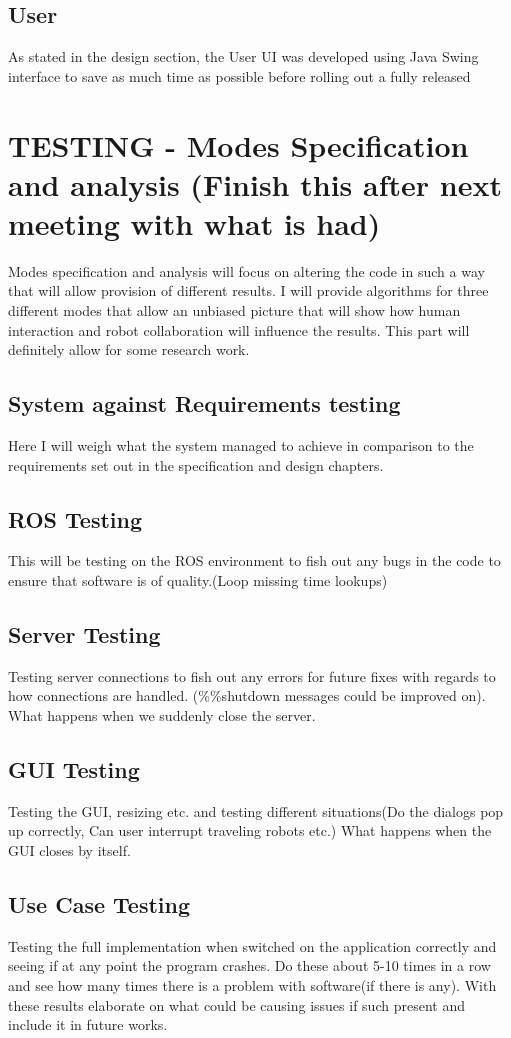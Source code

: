 \documentclass{report}
\begin{document}
    \section{User}
      As stated in the design section, the User UI was developed using Java Swing interface to save as much time as possible before rolling out a fully released 

  \chapter{TESTING - Modes Specification and analysis (Finish this after next meeting with what is had)}
    Modes specification and analysis will focus on altering the code in such a way that will allow provision of different results. I will provide algorithms for three different modes that allow an unbiased picture that will show how human interaction and robot collaboration will influence the results. This part will definitely allow for some research work.

    \section{System against Requirements testing}
      Here I will weigh what the system managed to achieve in comparison to the requirements set out in the specification and design chapters.
    \section{ROS Testing}
      This will be testing on the ROS environment to fish out any bugs in the code to ensure that software is of quality.(Loop missing time lookups)
    \section{Server Testing}
      Testing server connections to fish out any errors for future fixes with regards to how connections are handled. (\%\%shutdown messages could be improved on). What happens when we suddenly close the server.
    \section{GUI Testing}
      Testing the GUI, resizing etc. and testing different situations(Do the dialogs pop up correctly, Can user interrupt traveling robots etc.) What happens when the GUI closes by itself.
    \section{Use Case Testing}
      Testing the full implementation when switched on the application correctly and seeing if at any point the program crashes. Do these about 5-10 times in a row and see how many times there is a problem with software(if there is any). With these results elaborate on what could be causing issues if such present and include it in future works.
\end{document}
